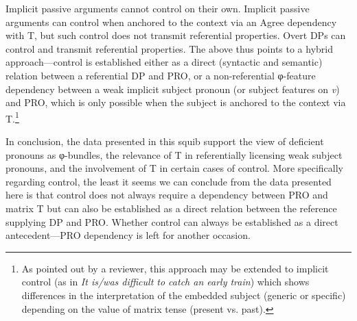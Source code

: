 \documentclass[output=paper]{langsci/langscibook}
\begin{document}
\ea
	\ea Implicit passive arguments cannot control on their own.
	\ex Implicit passive arguments can control when anchored to the context via an Agree dependency with T, but such control does not transmit referential properties.
	\ex Overt DPs can control and transmit referential properties.
	\z
\z
%
The above thus points to a hybrid approach—control is established either as a
direct (syntactic and semantic)  relation between a referential DP and
PRO, or a non-referential φ-feature dependency between a weak implicit subject
pronoun (or subject features on \emph{v}) and PRO, which is only possible when
the subject is anchored to the context via T.\footnote{As pointed out by a
    reviewer, this approach may be extended to implicit control (as in \emph{It
    is/was difficult to catch an early train}) which shows differences in the
interpretation of the embedded subject (generic or specific) depending on the
value of matrix tense (present vs. past).}

In conclusion, the data presented in this squib support the view of deficient
pronouns as φ-bundles, the relevance of T in referentially licensing weak
subject pronouns, and the involvement of T in certain cases of control. More
specifically regarding control, the least it seems we can conclude from the
data presented here is that control does not always require a dependency
between PRO and matrix T but can also be established as a direct relation
between the reference supplying DP and PRO. Whether control can always be
established as a direct antecedent—PRO dependency is left for another occasion.

\printchapterglossary{}

{\sloppy
\printbibliography[heading=subbibliography,notkeyword=this]
}
\end{document}
